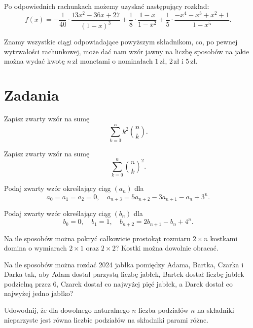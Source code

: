 \documentclass[shortabstract]{imthesis}
\begin{document}
    Po odpowiednich rachunkach możemy uzyskać następujący rozkład:
    $$
    f(x) = -\frac{1}{40}\cdot\frac{13 x^2 - 36 x + 27}{(1-x)^3} + \frac{1}{8} \cdot \frac{1-x}{1-x^2} + \frac{1}{5} \cdot \frac{-x^4-x^3+x^2+1}{1-x^5}.
    $$

    Znamy wszystkie ciągi odpowiadające powyższym składnikom, co, po pewnej wytrwałości rachunkowej, może dać nam wzór jawny na liczbę sposobów na jakie można wydać kwotę $n\,\text{zł}$ monetami o nominałach $1\,\text{zł}$, $2\,\text{zł}$ i $5\,\text{zł}$.

\newpage
\section{Zadania}

\begin{problem} \label{problem:k2newton}
Zapisz zwarty wzór na sumę
$$
\sum_{k=0}^n k^2{n \choose k}.
$$
\end{problem}
\begin{problem} \label{problem:newtonprod}
Zapisz zwarty wzór na sumę
$$
\sum_{k=0}^n {n \choose k}^2.
$$
\end{problem}
\begin{problem} \label{problem:receq1}
Podaj zwarty wzór określający ciąg $(a_n)$ dla $$a_0 = a_1 = a_2 = 0,\quad a_{n+3} = 5a_{n+2} - 3a_{n+1} - a_n + 3^n.$$
\end{problem}
\begin{problem} \label{problem:receq2}
Podaj zwarty wzór określający ciąg $(b_n)$ dla $$b_0 = 0,\quad b_1 = 1,\quad b_{n+2} = 2b_{n+1}-b_n + 4^n.$$
\end{problem}
\begin{problem} \label{problem:rectanglefilling}
Na ile sposobów można pokryć całkowicie prostokąt rozmiaru $2 \times n$ kostkami domina o wymiarach $2 \times 1$ oraz $2 \times 2$? Kostki można dowolnie obracać.  
\end{problem}
\begin{problem} \label{problem:abcd}
Na ile sposobów można rozdać 2024 jabłka pomiędzy Adama, Bartka, Czarka i Darka tak, aby Adam dostał parzystą liczbę jabłek, Bartek dostał liczbę jabłek podzielną przez 6, Czarek dostał co najwyżej pięć jabłek, a Darek dostał co najwyżej jedno jabłko?    
\end{problem}
\begin{problem} \label{problem:partitions}
Udowodnij, że dla dowolnego naturalnego $n$ liczba podziałów $n$ na składniki nieparzyste jest równa liczbie podziałów na składniki parami różne.
\end{problem}
\end{document}
